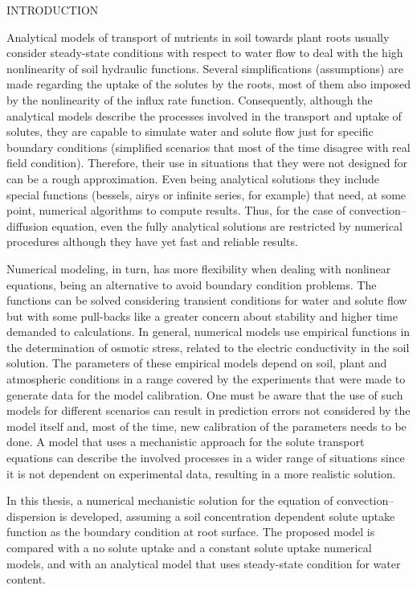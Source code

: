 \cleardoublepage
\chap INTRODUCTION

Analytical models of transport of nutrients in soil towards plant roots usually consider steady-state conditions with respect to water flow to deal with the high nonlinearity of soil hydraulic functions. 
Several simplifications (assumptions) are made regarding the uptake of the solutes by the roots, most of them also imposed by the nonlinearity of the influx rate function. 
Consequently, although the analytical models describe the processes involved in the transport and uptake of solutes, they are capable to simulate water and solute flow just for specific boundary conditions (simplified scenarios that most of the time  disagree with real field condition). Therefore, their use in situations that they were not designed for can be a rough approximation.
Even being analytical solutions they include special functions (bessels, airys or infinite series, for example) that need, at some point, numerical algorithms to compute results.
Thus, for the case of convection--diffusion equation, even the fully analytical solutions are restricted by numerical procedures although they have yet fast and reliable results.

Numerical modeling, in turn, has more flexibility when dealing with nonlinear equations, being an alternative to avoid boundary condition problems. 
The functions can be solved considering transient conditions for water and solute flow but with some pull-backs like a greater concern about stability and higher time demanded to calculations.
In general, numerical models use empirical functions in the determination of osmotic stress, related to the electric conductivity in the soil solution. 
The parameters of these empirical models depend on soil, plant and atmospheric conditions in a range covered by the experiments that were made to generate data for the model calibration. 
One must be aware that the use of such models for different scenarios can result in prediction errors 
not considered by the model itself and, most of the time, new calibration of the parameters needs to be done.
A model that uses a mechanistic approach for the solute transport equations can describe the involved processes in a wider range of situations since it is not dependent on experimental data, resulting in a more realistic solution.

In this thesis, a numerical mechanistic solution for the equation of convection--dispersion is developed, assuming a soil concentration dependent solute uptake function as the boundary condition at root surface. The proposed model is compared with a no solute uptake and a constant solute uptake numerical models, and with an analytical model that uses steady-state condition for water content. 


